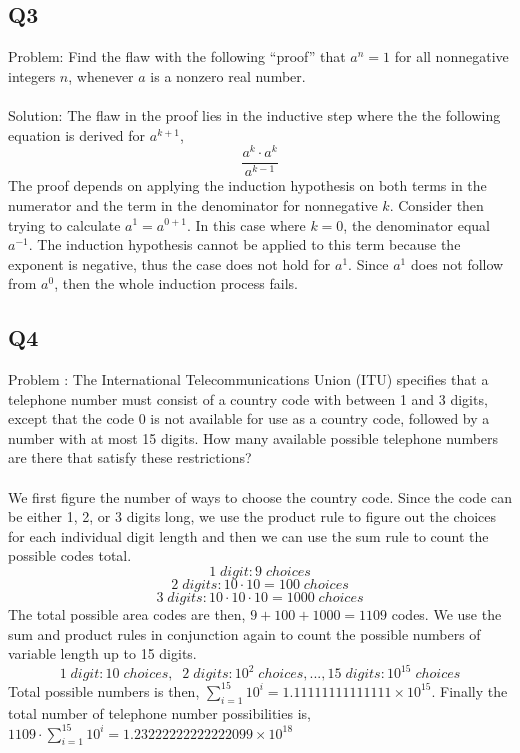 \documentclass[12pt, oneside]{article}
\begin{document}
\subsection*{Q3}
Problem: Find the flaw with the following “proof” that $a^{n} = 1$ for
all nonnegative integers $n$, whenever $a$ is a nonzero real
number.
\\\\
Solution: The flaw in the proof lies in the inductive step where the the following equation is derived for $a^{k+1}$,
\[\frac{a^{k}\cdot a^{k}}{a^{k-1}}\]
The proof depends on applying the induction hypothesis on both terms in the numerator and the term in the denominator for nonnegative $k$. Consider then trying to calculate $a^{1} = a^{0 + 1} $. In this case where $k=0$, the denominator equal $a^{-1}$. The induction hypothesis cannot be applied to this term because the exponent is negative, thus the case does not hold for $a^{1}$. Since $a^{1}$ does not follow from $a^{0}$, then the whole induction process fails.
\\
\subsection*{Q4}
Problem : The International Telecommunications Union (ITU)
specifies that a telephone number must consist of a country
code with between 1 and 3 digits, except that the code 0
is not available for use as a country code, followed by
a number with at most 15 digits. How many available
possible telephone numbers are there that satisfy these
restrictions?
\\\\
We first figure the number of ways to choose the country code. Since the code can be either 1, 2, or 3 digits long, we use the product rule to figure out the choices for each individual digit length and then we can use the sum rule to count the possible codes total. 
\[1\;digit: 9\;choices \]
\[2\;digits: 10\cdot 10 = 100\;choices\]
\[3\;digits: 10\cdot 10\cdot 10 = 1000\;choices\]
The total possible area codes are then, $9+100+1000 = 1109$ codes. We use the sum and product rules in conjunction again to count the possible numbers of variable length up to 15 digits.
\[1\;digit: 10\;choices,\;\;2\;digits: 10^{2}\;choices,...,15\;digits: 10^{15}\;choices\]
Total possible numbers is then, $\sum\limits_{i = 1}^{15} 10^{i} = 1.11111111111111\times10^{15}$. Finally the total number of telephone number possibilities is, $1109 \cdot \sum\limits_{i = 1}^{15} 10^{i} = 1.23222222222222099\times10^{18}$
\\
\end{document}
